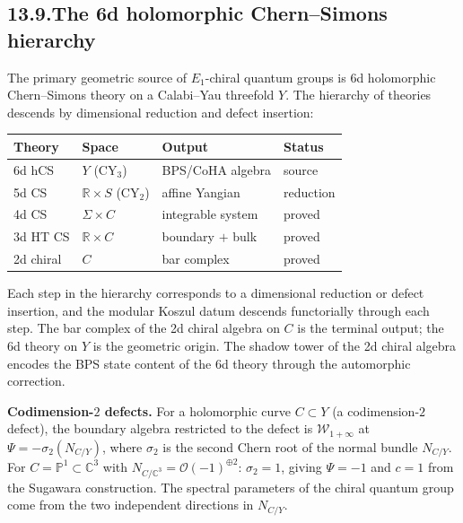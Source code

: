 \documentclass[11pt,reqno]{amsart}
\theoremstyle{definition}
\theoremstyle{remark}
\providecommand{\cO}{\mathcal{O}}
\providecommand{\cW}{\mathcal{W}}
\providecommand{\bC}{\mathbb{C}}
\providecommand{\bP}{\mathbb{P}}
\providecommand{\bR}{\mathbb{R}}
\numberwithin{equation}{section}
\begin{document}
\subsection*{13.9.\enspace The 6d holomorphic Chern--Simons hierarchy}

The primary geometric source of $E_1$-chiral quantum groups is
6d holomorphic Chern--Simons theory on a Calabi--Yau threefold
$Y$. The hierarchy of theories descends by dimensional reduction
and defect insertion:

\begin{center}
\renewcommand{\arraystretch}{1.15}
\begin{tabular}{llll}
\textbf{Theory} & \textbf{Space} & \textbf{Output} & \textbf{Status}\\ \hline
6d hCS & $Y$ (CY$_3$) & BPS/CoHA algebra & source\\
5d CS & $\bR \times S$ (CY$_2$) & affine Yangian & reduction\\
4d CS & $\Sigma \times C$ & integrable system & proved\\
3d HT CS & $\bR \times C$ & boundary $+$ bulk & proved\\
2d chiral & $C$ & bar complex & proved
\end{tabular}
\end{center}

\noindent
Each step in the hierarchy corresponds to a dimensional reduction
or defect insertion, and the modular Koszul datum descends
functorially through each step. The bar complex of the 2d chiral
algebra on $C$ is the terminal output; the 6d theory on $Y$ is the
geometric origin. The shadow tower of the 2d chiral algebra
encodes the BPS state content of the 6d theory through the
automorphic correction.

\medskip\noindent\textbf{Codimension-$2$ defects.}\enspace
For a holomorphic curve $C \subset Y$ (a codimension-$2$ defect),
the boundary algebra restricted to the defect is
$\cW_{1+\infty}$ at $\Psi = -\sigma_2(N_{C/Y})$, where
$\sigma_2$ is the second Chern root of the normal bundle
$N_{C/Y}$. For $C = \bP^1 \subset \bC^3$ with
$N_{C/\bC^3} = \cO(-1)^{\oplus 2}$: $\sigma_2 = 1$, giving
$\Psi = -1$ and $c = 1$ from the Sugawara construction.
The spectral parameters of the chiral quantum group come from the
two independent directions in $N_{C/Y}$.
\end{document}
